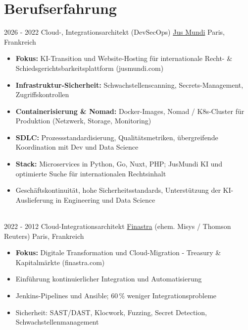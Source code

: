 \documentclass[letterpaper]{twentysecondcv} %
\begin{document}
\makeprofile %


\section{Berufserfahrung}

\begin{twentytimeline}
	\twentyitemtimeline{\faCloud}
		{2026 -}
		{2022}
		{Cloud-, Integrationsarchitekt (DevSecOps)}
		{\href{https://www.jusmundi.com}{Jus Mundi}}
		{Paris, Frankreich}
		{\begin{itemize}
		\item \textbf{Fokus:} KI-Transition und Website-Hosting für internationale Recht- \& Schiedsgerichtsbarkeitsplattform (jusmundi.com)
		\item \textbf{Infrastruktur-Sicherheit:} Schwachstellenscanning, Secrets-Management, Zugriffskontrollen
		\item \textbf{Containerisierung \& Nomad:} Docker-Images, Nomad / K8s-Cluster für Produktion (Netzwerk, Storage, Monitoring)
		\item \textbf{SDLC:} Prozessstandardisierung, Qualitätsmetriken, übergreifende Koordination mit Dev und Data Science
		\item \textbf{Stack:} Microservices in Python, Go, Nuxt, PHP; JusMundi KI und optimierte Suche für internationalen Rechtsinhalt
		\item Geschäftskontinuität, hohe Sicherheitsstandards, Unterstützung der KI-Auslieferung in Engineering und Data Science
		\end{itemize}}
	\\
	\twentyitemtimeline{\faUsers}
		{2022 -}
		{2012}
		{Cloud-Integrationsarchitekt}
		{\href{https://finastra.com}{Finastra} (ehem. Misys / Thomson Reuters)}
		{Paris, Frankreich}
		{\begin{itemize}
		\item \textbf{Fokus:} Digitale Transformation und Cloud-Migration - Treasury \& Kapitalmärkte (finastra.com)
		\item Einführung kontinuierlicher Integration und Automatisierung
		\item Jenkins-Pipelines und Ansible; 60\,\% weniger Integrationsprobleme
		\item Sicherheit: SAST/DAST, Klocwork, Fuzzing, Secret Detection, Schwachstellenmanagement

\end{itemize}}
\end{twentytimeline}
\end{document}
